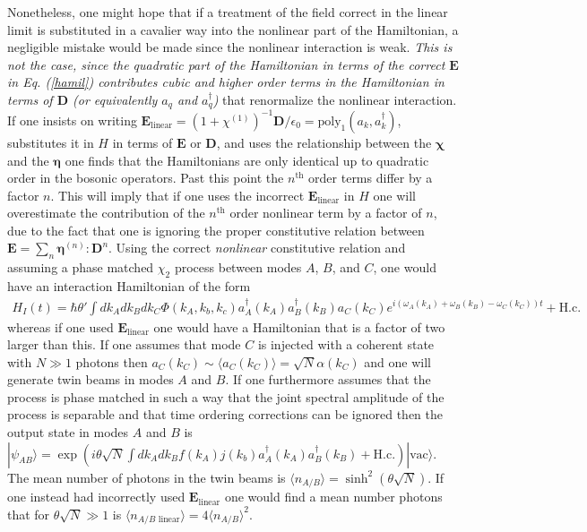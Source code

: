 \documentclass[letterpaper,10pt]{article}
\newcommand{\poly}{\text{poly}}
\newcommand{\ket}[1]{| #1 \rangle}
\newcommand{\braket}[1]{\langle #1 \rangle}
\newcommand{\hc}{\text{H.c.}}
\begin{document}
Nonetheless, one might hope that if a treatment of the field correct in the linear limit is substituted in a cavalier way into the nonlinear part of the Hamiltonian, a negligible mistake would be made since the nonlinear interaction is weak. \emph{This is not the case, since the quadratic part of the Hamiltonian in terms of the correct $\mathbf{E}$ in Eq. (\ref{hamil}) contributes cubic and higher order terms in the Hamiltonian in terms of $\mathbf{D}$ (or equivalently $a_q$ and $a_q^\dagger$)} that renormalize the nonlinear interaction. If one insists on writing $\mathbf{E}_{\text{linear}}=(1+\chi^{(1)})^{-1} \mathbf{D}/\epsilon_0=\poly_1(a_k,a_k^\dagger)$, substitutes it in $H$ in terms of $\mathbf{E}$ or $\mathbf{D}$, and uses the relationship between the $\mathbf{\chi}$ and the $\mathbf{\eta}$ one finds that the Hamiltonians are only identical up to quadratic order in the bosonic operators. Past this point the $n^{\text{th}}$ order terms differ by a factor $n$. This will imply that if one uses the incorrect $\textbf{E}_{\text{linear}}$ in $H$ one will overestimate the contribution of the  $n^{\text{th}}$ order nonlinear term by a factor of $n$, due to the fact that one is ignoring the proper constitutive relation between $\mathbf{E}=\sum_{n} \mathbf{\eta}^{(n)}: \mathbf{D}^n$. Using the correct \emph{nonlinear} constitutive relation and assuming a phase matched $\chi_2$ process between modes $A$, $B$, and $C$, one would have an interaction Hamiltonian of the form
\begin{align}\label{eq}
H_I(t)=\hbar \theta' \int dk_A dk_B dk_C \Phi(k_A,k_b,k_c) a_A^\dagger(k_A) a_B^\dagger(k_B) a_C (k_C) e^{i (\omega_A(k_A)+\omega_B(k_B)-\omega_C(k_C)) t}+\hc
\end{align}
whereas if one used $\mathbf{E}_{\text{linear}}$ one would have a Hamiltonian that is a factor of two larger than this.
If one assumes that mode $C$ is injected with a coherent state with $ N \gg 1$ photons then $a_C(k_C) \sim \braket{a_C(k_C)}=\sqrt{N} \alpha(k_C)$ and one will generate twin beams in modes $A$ and $B$. If one furthermore assumes that the process is phase matched in such a way that the joint spectral amplitude of the process is separable and that time ordering corrections can be ignored \cite{nico1} then the output state in modes $A$ and $B$ is $\ket{\psi_{AB}}=\exp\left(i \theta \sqrt{N}\int dk_A dk_B f(k_A) j(k_b)  a_A^\dagger(k_A) a_B^\dagger(k_B)+\hc\right) \ket{\text{vac}}$.
The mean number of photons in the twin beams is $\braket{n_{A/B}}=\sinh^2(\theta \sqrt{N})$. If one instead had incorrectly used $\textbf{E}_{\text{linear}}$ one would find a mean number photons that for $\theta \sqrt{N}\gg 1$ is $\braket{n_{A/B \text{ linear}}}=4\braket{n_{A/B}}^2$.
\end{document}
